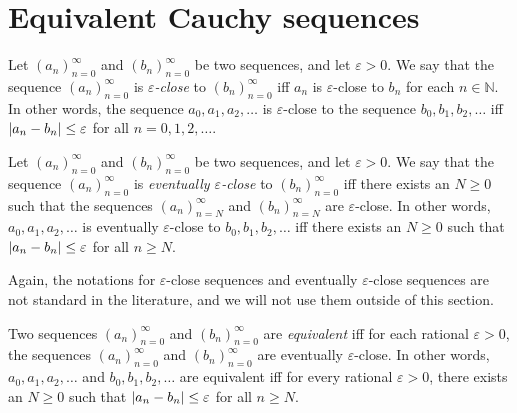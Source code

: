\section{Equivalent Cauchy sequences}\label{sec 5.2}

\begin{definition}\label{5.2.1}
Let \((a_n)_{n = 0}^{\infty}\) and \((b_n)_{n = 0}^{\infty}\) be two sequences, and let \(\varepsilon > 0\).
We say that the sequence \((a_n)_{n = 0}^{\infty}\) is \emph{\(\varepsilon\)-close} to \((b_n)_{n = 0}^{\infty}\) iff \(a_n\) is \(\varepsilon\)-close to \(b_n\) for each \(n \in \mathds{N}\).
In other words, the sequence \(a_0, a_1, a_2, \dots\) is \(\varepsilon\)-close to the sequence \(b_0, b_1, b_2, \dots\) iff \(\abs*{a_n - b_n} \leq \varepsilon\) for all \(n = 0, 1, 2, \dots\).
\end{definition}

\setcounter{theorem}{2}
\begin{definition}\label{5.2.3}
Let \((a_n)_{n = 0}^{\infty}\) and \((b_n)_{n = 0}^{\infty}\) be two sequences, and let \(\varepsilon > 0\).
We say that the sequence \((a_n)_{n = 0}^{\infty}\) is \emph{eventually \(\varepsilon\)-close} to \((b_n)_{n = 0}^{\infty}\) iff there exists an \(N \geq 0\) such that the sequences \((a_n)_{n = N}^{\infty}\) and \((b_n)_{n = N}^{\infty}\) are \(\varepsilon\)-close.
In other words, \(a_0, a_1, a_2, \dots\) is eventually \(\varepsilon\)-close to \(b_0, b_1, b_2, \dots\) iff there exists an \(N \geq 0\) such that \(\abs*{a_n - b_n} \leq \varepsilon\) for all \(n \geq N\).
\end{definition}

\begin{remark}\label{5.2.4}
Again, the notations for \(\varepsilon\)-close sequences and eventually \(\varepsilon\)-close sequences are not standard in the literature, and we will not use them outside of this section.
\end{remark}

\setcounter{theorem}{5}
\begin{definition}\label{5.2.6}
Two sequences \((a_n)_{n = 0}^{\infty}\) and \((b_n)_{n = 0}^{\infty}\) are \emph{equivalent} iff for each rational \(\varepsilon > 0\), the sequences \((a_n)_{n = 0}^{\infty}\) and \((b_n)_{n = 0}^{\infty}\) are eventually \(\varepsilon\)-close.
In other words, \(a_0, a_1, a_2, \dots\) and \(b_0, b_1, b_2, \dots\) are equivalent iff for every rational \(\varepsilon > 0\), there exists an \(N \geq 0\) such that \(\abs*{a_n - b_n} \leq \varepsilon\) for all \(n \geq N\).
\end{definition}

